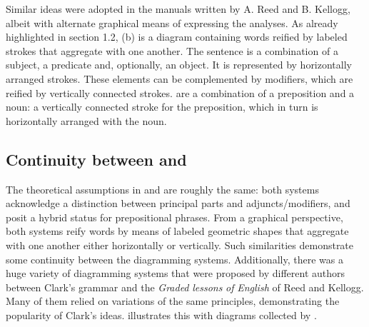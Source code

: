 \documentclass[output=paper]{langsci/langscibook}
\begin{document}
Similar ideas were adopted in the manuals written by A. Reed and B. Kellogg, albeit with alternate graphical means of expressing the analyses. As already highlighted in section 1.2, (b) is a diagram containing words reified by labeled strokes that aggregate with one another. The sentence is a combination of a subject, a predicate and, optionally, an object. It is represented by horizontally arranged strokes. These elements can be complemented by modifiers, which are reified by vertically connected strokes.  are a combination of a preposition and a noun: a vertically connected stroke for the preposition, which in turn is horizontally arranged with the noun. 

\subsection{Continuity between \citet{clark_science_1847} and \citet{reed_graded_1879}}

The theoretical assumptions in \citet{clark_science_1847} and \citet{reed_graded_1879} are roughly the same: both systems acknowledge a distinction between principal parts and adjuncts/modifiers, and posit a hybrid status for prepositional phrases. From a graphical perspective, both systems reify words by means of labeled geometric shapes that aggregate with one another either horizontally or vertically. Such similarities demonstrate some continuity between the diagramming systems. Additionally, there was a huge variety of diagramming systems that were proposed by different authors between Clark’s grammar and the \textit{Graded} \textit{lessons} \textit{of} \textit{English} of Reed and Kellogg. Many of them relied on variations of the same principles, demonstrating the popularity of Clark’s ideas.  illustrates this with diagrams collected by \citet{brittain_critical_1973}.

   
\end{document}
